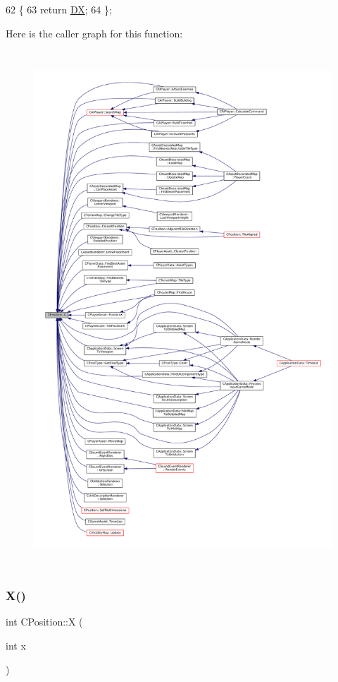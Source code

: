 \begin{DoxyCode}
62                      \{
63             \textcolor{keywordflow}{return} \hyperlink{classCPosition_a28445f9b872169715919074d82044eda}{DX};  
64         \};
\end{DoxyCode}
Here is the caller graph for this function\+:
\nopagebreak
\begin{figure}[H]
\begin{center}
\leavevmode
\includegraphics[height=550pt]{classCPosition_a9a6b94d3b91df1492d166d9964c865fc_icgraph}
\end{center}
\end{figure}
\hypertarget{classCPosition_abcbbd0f2a24118ff32560150c967b1da}{}\label{classCPosition_abcbbd0f2a24118ff32560150c967b1da} 
\subsubsection{\texorpdfstring{X()}{X()}\hspace{0.1cm}{\footnotesize\ttfamily [2/2]}}
{\footnotesize\ttfamily int C\+Position\+::X (\begin{DoxyParamCaption}\item[{int}]{x }\end{DoxyParamCaption})\hspace{0.3cm}{\ttfamily [inline]}}



